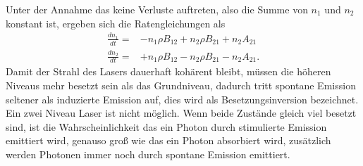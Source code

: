 Unter der Annahme das keine Verluste auftreten, also die Summe von $n_1$ und $n_2$ konstant ist, ergeben sich die Ratengleichungen als
\begin{align}
\frac{dn_1}{dt}=&-n_1 \rho B_{12} + n_2\rho B_{21} + n_2 A_{21}\\
\frac{dn_2}{dt}=&+n_1\rho B_{12} - n_2\rho B_{21} -n_2A_{21}.
\end{align}Damit der Strahl des Lasers dauerhaft kohärent bleibt, müssen die höheren Niveaus mehr besetzt sein als das Grundniveau, dadurch tritt spontane Emission seltener als induzierte Emission auf, dies wird als Besetzungsinversion bezeichnet.
Ein zwei Niveau Laser ist nicht möglich. Wenn beide Zustände gleich viel besetzt sind, ist die Wahrscheinlichkeit das ein Photon durch stimulierte Emission emittiert wird, genauso groß wie das ein Photon absorbiert wird, zusätzlich werden Photonen immer noch durch spontane Emission emittiert. 
